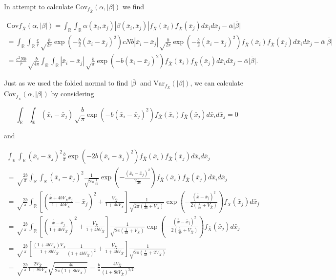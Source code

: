 \documentclass[]{article}
\begin{document}
In attempt to calculate \(\mathrm{Cov}_{f_{\bar X}}(\alpha,|\beta|)\) we
find

\begin{multline}
\mathrm{Cov}f_{\bar X}(\alpha,|\beta|)=\int_\mathbb{R}\int_\mathbb{R}\alpha(\bar x_i,\bar x_j)|\beta(\bar x_i,\bar x_j)|f_{\bar X}(\bar x_i)f_{\bar X}(\bar x_j)d\bar x_id\bar x_j-\bar\alpha\overline{|\beta|} \\
=\int_\mathbb{R}\int_\mathbb{R}\frac{c}{\bar r}\sqrt\frac{b}{2\pi}\exp\left(-\frac{b}{2}(\bar x_i-\bar x_j)^2\right)cNb|\bar x_i-\bar x_j|\sqrt\frac{b}{2\pi}\exp\left(-\frac{b}{2}(\bar x_i-\bar x_j)^2\right)f_{\bar X}(\bar x_i)f_{\bar X}(\bar x_j)d\bar x_id\bar x_j-\bar\alpha\overline{|\beta|} \\
=\frac{c^2Nb}{\bar r}\sqrt\frac{b}{4\pi}\int_\mathbb{R}\int_\mathbb{R}|\bar x_i-\bar x_j|\sqrt\frac{b}{\pi}\exp\left(-b(\bar x_i-\bar x_j)^2\right)f_{\bar X}(\bar x_i)f_{\bar X}(\bar x_j)d\bar x_id\bar x_j-\bar\alpha\overline{|\beta|}.
\end{multline}

Just as we used the folded normal to find \(\overline{|\beta|}\) and
\(\mathrm{Var}_{f_{\bar X}}(|\beta|)\), we can calculate
\(\mathrm{Cov}_{f_{\bar X}}(\alpha,|\beta|)\) by considering

\begin{equation}
\int_\mathbb{R}\int_\mathbb{R}(\bar x_i-\bar x_j)\sqrt\frac{b}{\pi}\exp\left(-b(\bar x_i-\bar x_j)^2\right)f_{\bar X}(\bar x_i)f_{\bar X}(\bar x_j)d\bar x_id\bar x_j=0
\end{equation}

and

\begin{multline}
\int_\mathbb{R}\int_\mathbb{R}(\bar x_i-\bar x_j)^2\frac{b}{\pi}\exp\left(-2b(\bar x_i-\bar x_j)^2\right)f_{\bar X}(\bar x_i)f_{\bar X}(\bar x_j)d\bar x_id\bar x_j \\
=\sqrt\frac{2b}{\pi}\int_\mathbb{R}\int_\mathbb{R}(\bar x_i-\bar x_j)^2\frac{1}{\sqrt{2\pi\frac{1}{4b}}}\exp\left(-\frac{(\bar x_i-\bar x_j)^2}{2\frac{1}{4b}}\right)f_{\bar X}(\bar x_i)f_{\bar X}(\bar x_j)d\bar x_id\bar x_j \\
=\sqrt\frac{2b}{\pi}\int_\mathbb{R}\left[\left(\frac{\bar{\bar x}+4bV_{\bar X}\bar x_j}{1+4bV_{\bar X}}-\bar x_j\right)^2+\frac{V_{\bar X}}{1+4bV_{\bar X}}\right]\frac{1}{\sqrt{2\pi(\frac{1}{4b}+V_{\bar X})}}\exp\left(-\frac{(\bar{\bar x}-\bar x_j)^2}{2(\frac{1}{4b}+V_{\bar X})}\right)f_{\bar X}(\bar x_j)d\bar x_j \\
=\sqrt\frac{2b}{\pi}\int_\mathbb{R}\left[\left(\frac{\bar{\bar x}-\bar x_j}{1+4bV_{\bar X}}\right)^2+\frac{V_{\bar X}}{1+4bV_{\bar X}}\right]\frac{1}{\sqrt{2\pi(\frac{1}{4b}+V_{\bar X})}}\exp\left(-\frac{(\bar{\bar x}-\bar x_j)^2}{2(\frac{1}{4b}+V_{\bar X})}\right)f_{\bar X}(\bar x_j)d\bar x_j \\
=\sqrt\frac{2b}{\pi}\left[\frac{(1+4bV_{\bar X})V_{\bar X}}{1+8bV_{\bar X}}\frac{1}{(1+4bV_{\bar X})^2}+\frac{V_{\bar X}}{1+4bV_{\bar X}}\right]\frac{1}{\sqrt{2\pi(\frac{1}{4b}+2V_{\bar X})}} \\
=\sqrt\frac{2b}{\pi}\frac{2V_{\bar X}}{1+8bV_{\bar X}}\sqrt{\frac{4b}{2\pi(1+8bV_{\bar X})}}=\frac{b}{\pi}\frac{4V_{\bar X}}{(1+8bV_{\bar X})^{3/2}}.
\end{multline}
\end{document}

